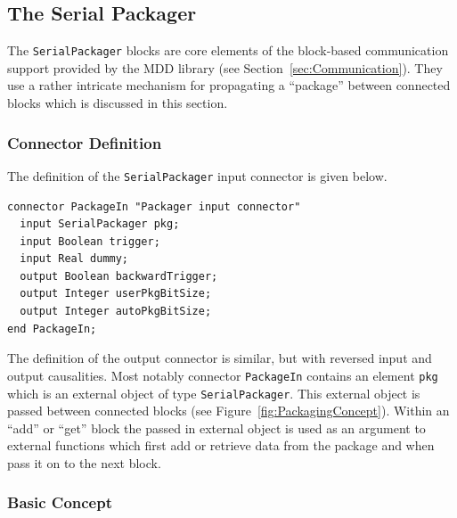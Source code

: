 \documentclass{resources/modelica}
\newcommand{\modelica}[1]{\lstinline[language=modelica]|#1|}
\begin{document}
\subsection{The Serial Packager}
\label{sec:SerialPackager}

The \modelica{SerialPackager} blocks are core elements of the block-based
communication support provided by the MDD library (see
Section~\ref{sec:Communication}). They use a rather intricate mechanism for
propagating a ``package'' between connected blocks which is discussed in this
section.

\subsubsection{Connector Definition}

The definition of the \modelica{SerialPackager} input connector is given below.
\begin{lstlisting}[language=modelica]
connector PackageIn "Packager input connector"
  input SerialPackager pkg;
  input Boolean trigger;
  input Real dummy;
  output Boolean backwardTrigger;
  output Integer userPkgBitSize;
  output Integer autoPkgBitSize;
end PackageIn;
\end{lstlisting}
The definition of the output connector is similar, but with reversed input and
output causalities. Most notably connector \modelica{PackageIn} contains an
element \modelica{pkg} which is an external object of type \modelica{SerialPackager}.
This external object is passed between connected blocks (see
Figure~\ref{fig:PackagingConcept}). Within an ``add'' or ``get'' block the
passed in external object is used as an argument to external functions which
first add or retrieve data from the package and when pass it on to the next block.

\subsubsection{Basic Concept}
\end{document}
